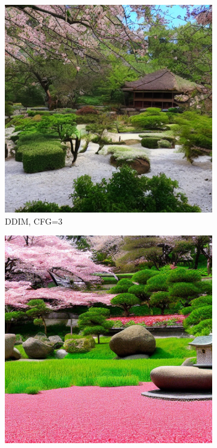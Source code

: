 \documentclass[10pt,twocolumn]{article}
\begin{document}
\begin{figure}[H]
    \centering
    \begin{subfigure}{0.32\textwidth}
        \includegraphics[width=\linewidth]{figures/baseline_ddim_cfg3.0_512_prompt8_20250712_111136.png}
        \caption{DDIM, CFG=3}
    \end{subfigure}
    \begin{subfigure}{0.32\textwidth}
        \includegraphics[width=\linewidth]{figures/baseline_ddim_cfg10.0_512_prompt8_20250712_111309.png}

\end{subfigure}
\end{figure}
\end{document}
